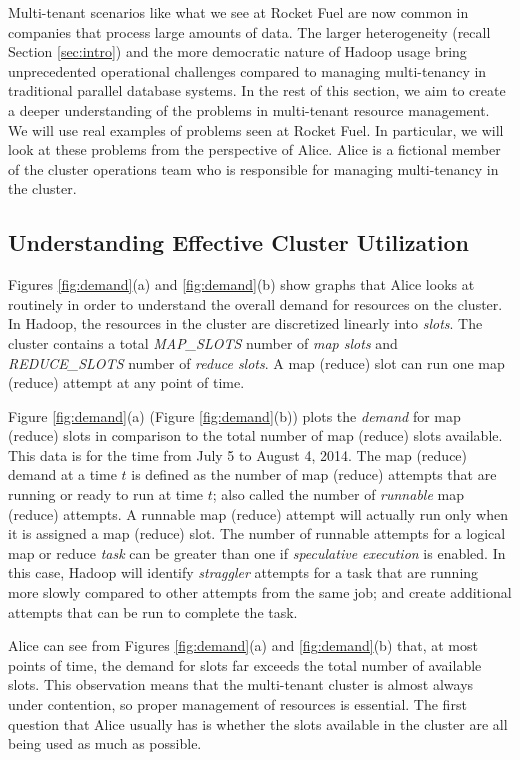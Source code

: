 Multi-tenant scenarios like what we see at Rocket Fuel are now 
common in companies that process large amounts of data. 
The larger heterogeneity (recall Section \ref{sec:intro})
and the more democratic nature of Hadoop usage bring 
unprecedented operational challenges compared to managing 
multi-tenancy in traditional parallel database systems.
In the rest of this section, we aim to create a deeper understanding of 
the problems in multi-tenant resource management. We will use real examples 
of problems seen at Rocket Fuel. In particular, we will look at 
these problems from the perspective of Alice. Alice  is 
a fictional member of the cluster operations team who is
responsible for managing multi-tenancy in the cluster. 

\subsection {Understanding Effective Cluster Utilization}
\label{sec:effective-utilization}

Figures \ref{fig:demand}(a) and \ref{fig:demand}(b)
show graphs that Alice looks at routinely
in order to understand the overall demand for resources 
on the cluster. In Hadoop, the resources in the 
cluster are discretized linearly into {\em slots}. The cluster
contains a total {\em MAP\_SLOTS} number of {\em map slots} and 
{\em REDUCE\_SLOTS}  number of {\em reduce slots}. A map (reduce) 
slot can run one map (reduce) attempt at any point of time.

Figure \ref{fig:demand}(a) (Figure \ref{fig:demand}(b))
plots the {\em demand} for map (reduce) slots
in comparison to the total number of map (reduce) slots available. 
This data is for the time from July 5 to August 4, 2014. 
The map (reduce) demand at a time $t$ is defined as the number of map 
(reduce) attempts that are running or ready to run
at time $t$; also called the number of {\em runnable} map (reduce) 
attempts. A runnable map (reduce) attempt will actually run only when it is 
assigned a map (reduce) slot. The number of runnable attempts 
for a logical map or reduce {\em task} can be greater than one if 
{\em speculative execution} is enabled. In this case, Hadoop will 
identify {\em straggler} attempts for a task that are running more
slowly compared to 
other attempts from the same job; and create additional attempts 
that can be run to complete the task.

Alice can see from Figures \ref{fig:demand}(a) and 
\ref{fig:demand}(b) that, at most points of time, the demand 
for slots far exceeds the total number of available slots. 
This observation means that the multi-tenant cluster is 
almost always under contention, so proper management
of resources is essential. The first question that Alice 
usually has is whether the slots available in the cluster are 
all being used as much as possible. 

